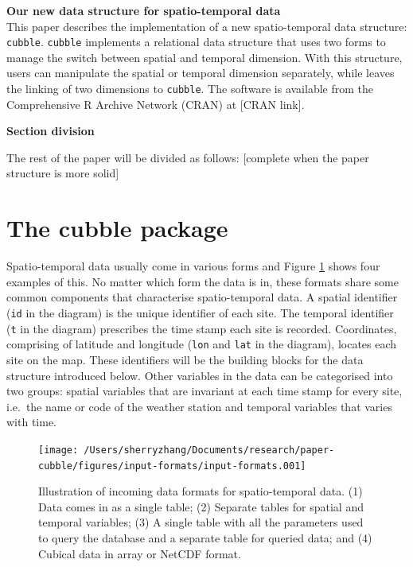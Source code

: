 \documentclass[
]{jss}
\begin{document}
\textbf{Our new data structure for spatio-temporal data}\\
This paper describes the implementation of a new spatio-temporal data
structure: \texttt{cubble}. \texttt{cubble} implements a relational data
structure that uses two forms to manage the switch between spatial and
temporal dimension. With this structure, users can manipulate the
spatial or temporal dimension separately, while leaves the linking of
two dimensions to \texttt{cubble}. The software is available from the
Comprehensive R Archive Network (CRAN) at {[}CRAN link{]}. \newline

\textbf{Section division}

The rest of the paper will be divided as follows: {[}complete when the
paper structure is more solid{]}

\newpage

\hypertarget{the-cubble-package}{%
\section{The cubble package}\label{the-cubble-package}}

Spatio-temporal data usually come in various forms and Figure
\ref{fig:cubble-diagram} shows four examples of this. No matter which
form the data is in, these formats share some common components that
characterise spatio-temporal data. A spatial identifier (\texttt{id} in
the diagram) is the unique identifier of each site. The temporal
identifier (\texttt{t} in the diagram) prescribes the time stamp each
site is recorded. Coordinates, comprising of latitude and longitude
(\texttt{lon} and \texttt{lat} in the diagram), locates each site on the
map. These identifiers will be the building blocks for the data
structure introduced below. Other variables in the data can be
categorised into two groups: spatial variables that are invariant at
each time stamp for every site, i.e.~the name or code of the weather
station and temporal variables that varies with time.

\begin{CodeChunk}
\begin{figure}

{\centering \texttt{[image: /Users/sherryzhang/Documents/research/paper-cubble/figures/input-formats/input-formats.001]} 

}

\caption[Illustration of incoming data formats for spatio-temporal data]{Illustration of incoming data formats for spatio-temporal data. (1) Data comes in as a single table; (2) Separate tables for spatial and temporal variables; (3) A single table with all the parameters used to query the database and a separate table for queried data; and (4) Cubical data in array or NetCDF format.}\label{fig:cubble-diagram}
\end{figure}
\end{CodeChunk}
\end{document}
